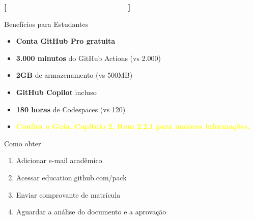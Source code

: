 \documentclass[10pt, brazil]{beamer}
\begin{document}
\begin{frame}{\textcolor{lightpurple}{\textbf{[}} \textbf{\textcolor{white}{GitHub Student Developer Pack}} \textcolor{lightpurple}{\textbf{]}}}
  
  \begin{block}{Benefícios para Estudantes}
    \begin{itemize}
      \item \textbf{Conta GitHub Pro gratuita}
      \item \textbf{3.000 minutos} do GitHub Actions (vs 2.000)
      \item \textbf{2GB} de armazenamento (vs 500MB)
      \item \textbf{GitHub Copilot} incluso
      \item \textbf{180 horas} de Codespaces (vs 120)
      \item \textcolor{yellow}{\textbf{Confira o Guia, Capítulo 2, Item 2.2.1 para maiores informações.}}
    \end{itemize}
  \end{block}

  \vspace{1em}
  
  \begin{alertblock}{Como obter}
    \begin{enumerate}
      \item Adicionar e-mail acadêmico
      \item Acessar education.github.com/pack
      \item Enviar comprovante de matrícula
      \item Aguardar a análise do documento e a aprovação
    \end{enumerate}
  \end{alertblock}

\end{frame}
\end{document}
